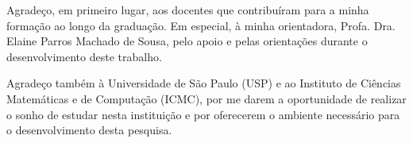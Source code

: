 
Agradeço, em primeiro lugar, aos docentes que contribuíram para a minha formação ao longo da graduação. Em especial, à minha orientadora, Profa. Dra. Elaine Parros Machado de Sousa, pelo apoio e pelas orientações durante o desenvolvimento deste trabalho.

Agradeço também à Universidade de São Paulo (USP) e ao Instituto de Ciências Matemáticas e de Computação (ICMC), por me darem a oportunidade de realizar o sonho de estudar nesta instituição e por oferecerem o ambiente necessário para o desenvolvimento desta pesquisa.